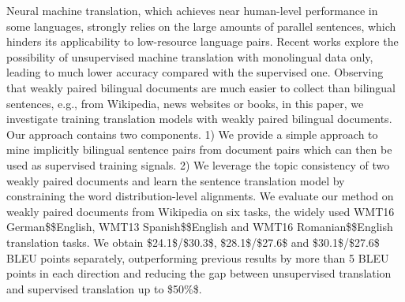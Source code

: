 Neural machine translation, which achieves near human-level performance in some languages, strongly relies on the large amounts of parallel sentences, which hinders its applicability to low-resource language pairs. Recent works explore the possibility of unsupervised machine translation with monolingual data only, leading to much lower accuracy compared with the supervised one. Observing that weakly paired bilingual documents are much easier to collect than bilingual sentences, e.g., from Wikipedia, news websites or books, in this paper, we investigate training translation models with weakly paired bilingual documents. Our approach contains two components. 1) We provide a simple approach to mine implicitly bilingual sentence pairs from document pairs which can then be used as supervised training signals. 2) We leverage the topic consistency of two weakly paired documents and learn the sentence translation model by constraining the word distribution-level alignments.  We evaluate our method on weakly paired documents from Wikipedia on six tasks, the widely used WMT16 German\$\leftrightarrow\$English, WMT13 Spanish\$\leftrightarrow\$English and WMT16 Romanian\$\leftrightarrow\$English translation tasks. We obtain \$24.1\$/\$30.3\$, \$28.1\$/\$27.6\$ and \$30.1\$/\$27.6\$ BLEU points separately, outperforming previous results by more than 5 BLEU points in each direction and reducing the gap between unsupervised translation and supervised translation up to \$50\%\$.